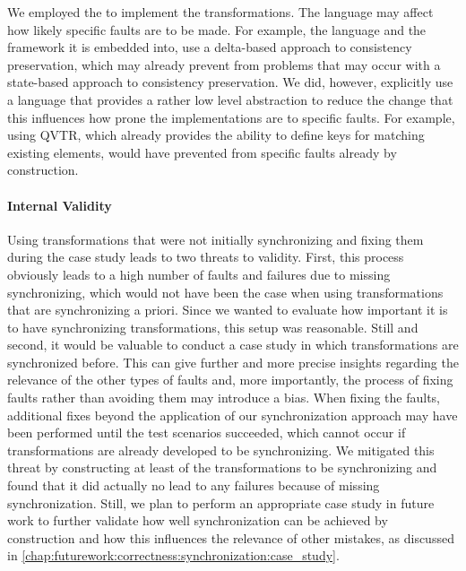 We employed the \reactionslanguage to implement the transformations.
The language may affect how likely specific faults are to be made.
For example, the language and the \vitruv framework it is embedded into, use a delta-based approach to consistency preservation, which may already prevent from problems that may occur with a state-based approach to consistency preservation.
We did, however, explicitly use a language that provides a rather low level abstraction to reduce the change that this influences how prone the implementations are to specific faults.
For example, using \gls{QVTR}, which already provides the ability to define keys for matching existing elements, would have prevented from specific faults already by construction.

\paragraph{Internal Validity}

Using transformations that were not initially synchronizing and fixing them during the case study leads to two threats to validity. 
First, this process obviously leads to a high number of faults and failures due to missing synchronizing, which would not have been the case when using transformations that are synchronizing a priori.
Since we wanted to evaluate how important it is to have synchronizing transformations, this setup was reasonable.
Still and second, it would be valuable to conduct a case study in which transformations are synchronized before.
This can give further and more precise insights regarding the relevance of the other types of faults and, more importantly, the process of fixing faults rather than avoiding them may introduce a bias.
When fixing the faults, additional fixes beyond the application of our synchronization approach may have been performed until the test scenarios succeeded, which cannot occur if transformations are already developed to be synchronizing.
We mitigated this threat by constructing at least of the transformations to be synchronizing and found that it did actually no lead to any failures because of missing synchronization.
Still, we plan to perform an appropriate case study in future work to further validate how well synchronization can be achieved by construction and how this influences the relevance of other mistakes, as discussed in \autoref{chap:futurework:correctness:synchronization:case_study}.

